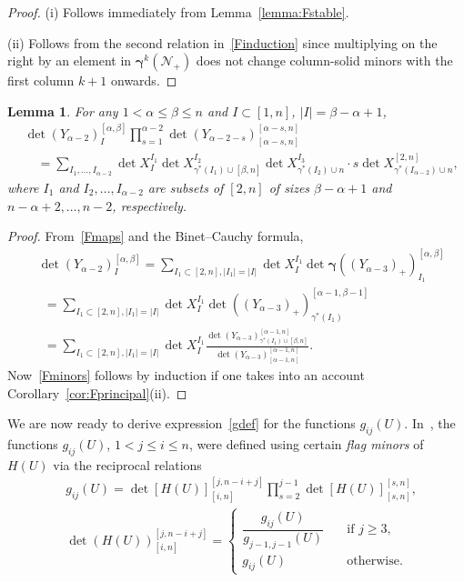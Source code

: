 \documentclass{amsart}
\newtheorem{lemma}[theorem]{Lemma}
\theoremstyle{definition}
\theoremstyle{remark}
\numberwithin{equation}{section}
\numberwithin{theorem}{section}
\def\N{\mathcal N}
\def\bgamma{\pmb\gamma}
\begin{document}
\begin{proof} (i) Follows immediately from Lemma~\ref{lemma:Fstable}.

(ii) Follows from the second relation in~\eqref{Finduction} since multiplying on the right by an element in 
$\bgamma^k(\N_+)$ does not change column-solid minors with the first column $k+1$ onwards.
\end{proof}

\begin{lemma}
\label{lem:Fminors}
For any $1< \alpha \le \beta \le n$ and $ I\subset [1,n]$, $|I|=\beta -\alpha +1$,
\begin{equation}\label{Fminors}
\begin{aligned}
&\det(Y_{\alpha-2})_I^{[\alpha,\beta]} \prod_{s=1}^{\alpha-2}\det(Y_{\alpha-2-s})_{[\alpha-s,n]}^{[\alpha-s,n]} \\
&\quad =  \sum_{I_1,\ldots, I_{\alpha-2}}
\det X^{I_1}_{I} \det X_{\gamma^*(I_1)\cup [\beta,n]}^{I_2}  \det X_{\gamma^*(I_2)\cup n}^{I_3} {\cdot}s  
\det X_{\gamma^*(I_{\alpha-2})\cup n}^{[2,n]},
\end{aligned}
\end{equation}
where $I_1$ and  $I_2, \ldots, I_{\alpha-2}$ are subsets of $[2,n]$ of sizes $\beta - \alpha +1$ and $n- \alpha +2, \ldots, n- 2$, respectively.
\end{lemma}

\begin{proof} From~\eqref{Fmaps} and the Binet--Cauchy formula,
\begin{align*}
&\det(Y_{\alpha-2})_I^{[\alpha,\beta]}  = \sum_{I_1\subset [2,n], |I_1|=|I|} \det X^{I_1}_{I} 
\det\bgamma((Y_{\alpha-3})_+)_{I_1}^{[\alpha,\beta]}\\
&\ \ = \sum_{I_1\subset [2,n], |I_1|=|I|} \det X^{I_1}_{I} \det((Y_{\alpha-3})_+)_{\gamma^*(I_1)}^{[\alpha-1,\beta-1]} \\ 
& \ \ = \sum_{I_1\subset [2,n], |I_1|=|I|} \det X^{I_1}_{I} 
\frac{ \det (Y_{\alpha-3})_{\gamma^*(I_1)\cup [\beta,n]}^{[\alpha-1,n]}}{ \det(Y_{\alpha-3})_{[\alpha-1,n]}^{[\alpha-1,n]}}.
\end{align*}
Now~\eqref{Fminors} follows by induction if one takes into an account Corollary~\ref{cor:Fprincipal}(ii).
\end{proof}

We are now ready to derive expression~\eqref{gdef} for the functions $g_{ij}(U)$. 
In~\cite[Section 7.2]{GV}, the functions  $g_{ij}(U)$, $1< j \leq i \leq n$, were defined using certain 
{\em flag minors\/} of $H(U)$ via the reciprocal relations
\begin{equation}\label{eq:fopflags}
\begin{aligned}
&g_{ij}(U)=\det [H(U)]_{[i,n]}^{[j,n-i+j]}\prod_{s=2}^{j-1}\det [H(U)]_{[s,n]}^{[s,n]}, \\ 
&\det (H(U))_{[i,n]}^{[j,n-i+j]} = \begin{cases}
    \dfrac{g_{ij}(U)}{g_{j-1,j-1}(U)} \quad &\text{if $j\geq 3$},\\
    g_{ij}(U) \quad &\text{otherwise}.
\end{cases}
\end{aligned}
\end{equation}
\end{document}
